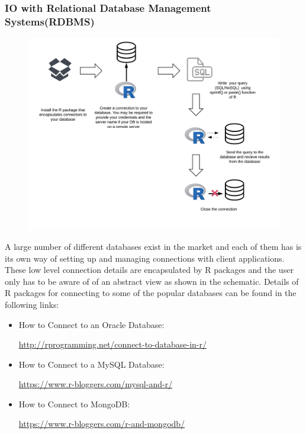 \subsubsection{IO with Relational Database Management Systems(RDBMS)}
\begin{figure}[ht]
 \centering
    \includegraphics[width = 15 cm]{./viz/ext/IO_R_RDBMS.jpeg}
\end{figure}
\begin{HIGHLIGHT}
A large number of different databases exist in the market and each of them has is its own way of setting up and managing connections with client applications. These low level connection details are encapsulated by R packages and the user only has to be aware of of an abstract view as shown in the schematic. Details of R packages for connecting to some of the popular databases can be found in the following links:
\begin{itemize}
  \item How to Connect to an Oracle Database:
  
  \textcolor{cyan}{\url {http://rprogramming.net/connect-to-database-in-r/}}
  \item How to Connect to a MySQL Database:
  
  \textcolor{cyan}{\url {https://www.r-bloggers.com/mysql-and-r/}}
  \item How to Connect to MongoDB: 
  
  \textcolor{cyan}{\url {https://www.r-bloggers.com/r-and-mongodb/}}
\end{itemize}

\end{HIGHLIGHT}
